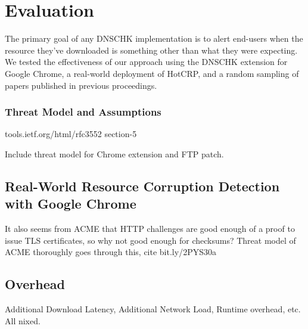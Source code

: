 \section{Evaluation} \label{sec:evaluation}

The primary goal of any DNSCHK implementation is to alert end-users when the
resource they've downloaded is something other than what they were expecting. We
tested the effectiveness of our approach using the DNSCHK extension for Google
Chrome, a real-world deployment of HotCRP, and a random sampling of papers
published in previous \CONFERENCE{} proceedings.

\subsubsection{Threat Model and Assumptions}

tools.ietf.org/html/rfc3552 section-5

Include threat model for Chrome extension and FTP patch.

\subsection{Real-World Resource Corruption Detection with Google Chrome}

It also seems from ACME that HTTP challenges are good enough of a proof
to issue TLS certificates, so why not good enough for checksums? Threat model of
ACME thoroughly goes through this, cite bit.ly/2PYS30a

\subsection{Overhead}

Additional Download Latency, Additional Network Load, Runtime overhead, etc. All
nixed.
